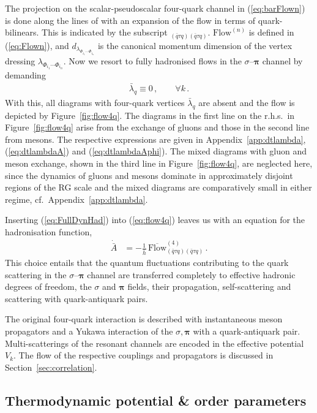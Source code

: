 \documentclass[%
reprint,
superscriptaddress,
showpacs,preprintnumbers,
 amsmath,amssymb,
 aps,
prd,
]{revtex4-1}
\def\Fig#1{Figure~\ref{#1}}
\def\eq#1{(\ref{#1})}
\def\sec#1{Section~\ref{#1}}
\def\app#1{Appendix~\ref{#1}}
\begin{document}
The projection on the scalar-pseudoscalar four-quark channel in
\eq{eq:barFlown} is done along the lines of \cite{Braun:2011pp} with
an expansion of the flow in terms of quark-bilinears. This is
indicated by the subscript ${}_{(\bar q\tau q)(\bar q\tau q)}$.
$\textrm{Flow}^{(n)}$ is defined in \eq{eq:Flown}, and
$d_{\lambda_{{\Phi_{i_1}\cdots\Phi_{i_n}}}}$ is the canonical momentum
dimension of the vertex dressing
$\lambda_{\Phi_{i_1}\cdots\Phi_{i_n}}$.  Now we resort to fully
hadronised flows in the $\sigma$--$\bm\pi$ channel by demanding
%
\begin{align}\label{eq:FullDynHad}
  \bar\lambda_q \equiv 0\,,\qquad \forall k\,.
\end{align}
%
With this, all diagrams with four-quark vertices $\bar \lambda_q$ are
absent and the flow is depicted by \Fig{fig:flow4q}. The diagrams in
the first line on the r.h.s.\ in \Fig{fig:flow4q} arise from the
exchange of gluons and those in the second line from mesons. The
respective expressions are given in \app{app:dtlambda},
\eq{eq:dtlambdaA} and \eq{eq:dtlambdaAphi}. The mixed diagrams with
gluon and meson exchange, shown in the third line in \Fig{fig:flow4q},
are neglected here, since the dynamics of gluons and mesons dominate
in approximately disjoint regions of the RG scale and the mixed
diagrams are comparatively small in either regime, cf.\
\app{app:dtlambda}.

Inserting \eq{eq:FullDynHad} into \eq{eq:flow4q} leaves us with an
equation for the hadronisation function,
%
\begin{align}
  \dot{\bar A}&=-\frac{1}{\bar{h}}\,\overline{
                \textrm{Flow}}^{(4)}_{(\bar q\tau q)(\bar q\tau q)}\,.
 \label{}
\end{align}
%
This choice entails that the quantum fluctuations contributing to the
quark scattering in the $\sigma$--$\bm\pi$ channel are transferred
completely to effective hadronic degrees of freedom, the $\sigma$ and
$\bm\pi$ fields, their propagation, self-scattering and scattering
with quark-antiquark pairs.

The original four-quark interaction is described with instantaneous
meson propagators and a Yukawa interaction of the $\sigma,\bm\pi$ with
a quark-antiquark pair. Multi-scatterings of the resonant channels are
encoded in the effective potential $V_k$. The flow of the respective
couplings and propagators is discussed in \sec{sec:correlation}.


\subsection{Thermodynamic potential \& order
  parameters}\label{sec:TPot+Order}
\end{document}
